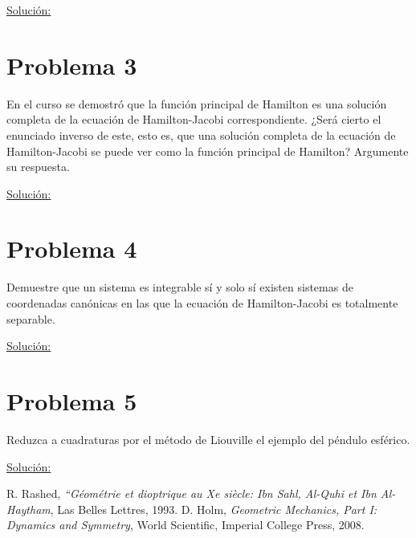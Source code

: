 \documentclass[a4paper,10pt]{article}
\numberwithin{equation}{section}
\begin{document}
\underline{Solución:} \vspace{.3cm}

\section{Problema 3}

En el curso se demostró que la función principal de Hamilton es una solución completa 
de la ecuación de Hamilton-Jacobi correspondiente. ¿Será cierto el enunciado inverso 
de este, esto es, que una solución completa de la ecuación de Hamilton-Jacobi se puede 
ver como la función principal de Hamilton? Argumente su respuesta.

\vspace{.3cm}

\underline{Solución:} \vspace{.3cm}

\section{Problema 4}

Demuestre que un sistema es integrable sí y solo sí existen sistemas de coordenadas 
canónicas en las que la ecuación de Hamilton-Jacobi es totalmente separable.

\vspace{.3cm}

\underline{Solución:} \vspace{.3cm}

\section{Problema 5}

Reduzca a cuadraturas por el método de Liouville el ejemplo del péndulo esférico.

\vspace{.3cm}

\underline{Solución:} \vspace{.3cm}

\begin{thebibliography}{10}
R. Rashed, \emph{“Géométrie et dioptrique au Xe siècle: Ibn Sahl, 
Al-Quhi et Ibn Al-Haytham}, Las Belles Lettres, 1993.
D. Holm, \emph{Geometric Mechanics, Part I: Dynamics and Symmetry}, World Scientific, 
Imperial College Press, 2008.
\end{thebibliography}
\end{document}
